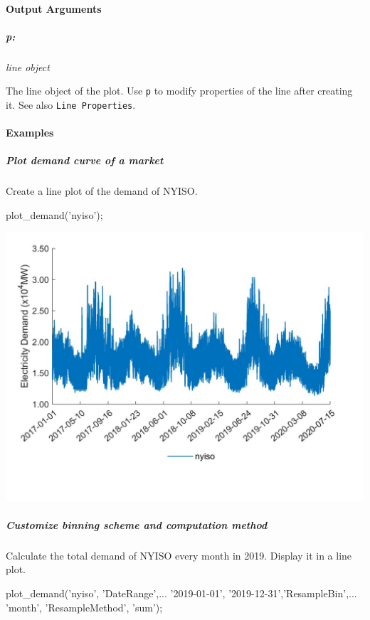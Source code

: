 \documentclass[11pt]{article}
\numberwithin{equation}{section}
\numberwithin{table}{section}
\numberwithin{figure}{section}
\begin{document}
\paragraph{Output Arguments}
\subparagraph{p:} \textit{line object}

The line object of the plot. Use \verb!p! to modify properties of the line after creating it. See also \verb!Line Properties!.



\paragraph{Examples}
\subparagraph{Plot demand curve of a market}

Create a line plot of the demand of NYISO.

\begin{Code}
  plot_demand('nyiso');
\end{Code}

\begin{center}
  \noindent\includegraphics[width=\textwidth]{figures/plot_demand_example1.jpg}
\end{center}

\subparagraph{Customize binning scheme and computation method}

Calculate the total demand of NYISO every month in 2019. Display it in a line plot.

\begin{Code}
  plot_demand('nyiso', 'DateRange',...
  {'2019-01-01', '2019-12-31'},'ResampleBin',...
  'month', 'ResampleMethod', 'sum');
\end{Code}
\end{document}
